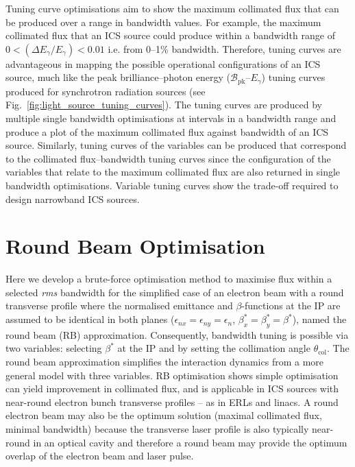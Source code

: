 \documentclass[../main.tex]{subfiles}
\begin{document}
Tuning curve optimisations aim to show the maximum collimated flux that can be produced over a range in bandwidth values. For example, the maximum collimated flux that an ICS source could produce within a bandwidth range of $0 < \left(\Delta E_{\gamma}/E_{\gamma}\right) < 0.01$ i.e. from 0--1\% bandwidth. Therefore, tuning curves are advantageous in mapping the possible operational configurations of an ICS source, much like the peak brilliance--photon energy ($\mathcal{B}_{\mathrm{pk}}$--$E_{\gamma}$) tuning curves produced for synchrotron radiation sources (see Fig.~\ref{fig:light_source_tuning_curves}). The tuning curves are produced by multiple single bandwidth optimisations at intervals in a bandwidth range and produce a plot of the maximum collimated flux against bandwidth of an ICS source. Similarly, tuning curves of the variables can be produced that correspond to the collimated flux--bandwidth tuning curves since the configuration of the variables that relate to the maximum collimated flux are also returned in single bandwidth optimisations. Variable tuning curves show the trade-off required to design narrowband ICS sources. 

\section{Round Beam Optimisation}
\label{sec:RB_optimisation}

Here we develop a brute-force optimisation method to maximise flux within a selected \textit{rms} bandwidth for the simplified case of an electron beam with a round transverse profile where the normalised emittance and $\beta$-functions at the IP are assumed to be identical in both planes ($\epsilon_{nx} = \epsilon_{ny} = \epsilon_{n}$, $\beta_{x}^{*} = \beta_{y}^{*} = \beta^{*}$), named the round beam (RB) approximation. Consequently, bandwidth tuning is possible via two variables: selecting $\beta^{*}$ at the IP and by setting the collimation angle $\theta_{\mathrm{col}}$.  The round beam approximation simplifies the interaction dynamics from a more general model with three variables. RB optimisation shows simple optimisation can yield improvement in collimated flux, and is applicable in ICS sources with near-round electron bunch transverse profiles -- as in ERLs and linacs. A round electron beam may also be the optimum solution (maximal collimated flux, minimal bandwidth) because the transverse laser profile is also typically near-round in an optical cavity \cite{dupraz2020thomx} and therefore a round beam may provide the optimum overlap of the electron beam and laser pulse.
\end{document}
